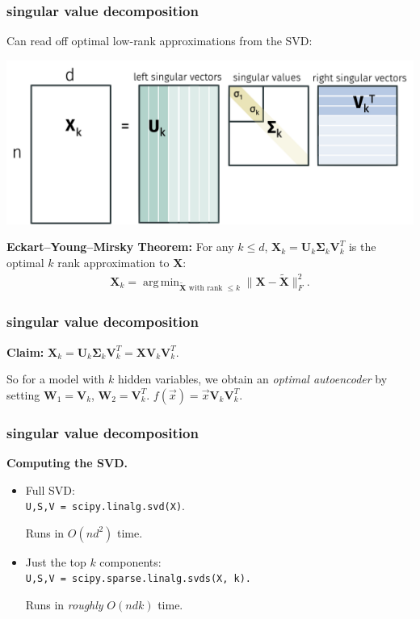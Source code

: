 \documentclass[handout,compress]{beamer}
\newcommand{\bs}[1]{\boldsymbol{#1}}
\newcommand{\bv}[1]{\mathbf{#1}}
\DeclareMathOperator*{\argmin}{arg\,min}
\begin{document}
\begin{frame}[t]
	\frametitle{singular value decomposition}
	Can read off optimal low-rank approximations from the SVD:
	\begin{center}
		\includegraphics[width=.9\textwidth]{svdk.png}
	\end{center} 
	\textbf{Eckart–Young–Mirsky Theorem:} For any $k \leq d$, $\bv{X}_k = \bv{U}_k\bs{\Sigma}_k\bv{V}_k^T$ is the optimal $k$ rank approximation to $\bv{X}$:
	\begin{align*}
	\bv{X}_k = 	\argmin_{\tilde{\bv{X}} \text{ with rank $\leq k$} } \|\bv{X} - \tilde{\bv{X}}\|_F^2.
	\end{align*}
\end{frame}

\begin{frame}[t]
	\frametitle{singular value decomposition}
	\textbf{Claim:} $\bv{X}_k = \bv{U}_k\bs{\Sigma}_k\bv{V}_k^T = \bv{X}\bv{V}_k\bv{V}_k^T$.
	\vspace{15em}
	
	So for a model with $k$ hidden variables, we obtain an \emph{optimal autoencoder} by setting $\bv{W}_1 =\bv{V}_k$, $\bv{W}_2 = \bv{V}_k^T$. $f(\vec{x}) = \vec{x}\bv{V}_k\bv{V}_k^T$.
\end{frame}

\begin{frame}[t]
	\frametitle{singular value decomposition}
	\begin{center}
		\textbf{Computing the SVD.}
	\end{center} 
	\begin{itemize}
		\item Full SVD:\\
		\texttt{U,S,V = scipy.linalg.svd(X)}. 
		\begin{center}
		\alert{Runs in $O(nd^2)$ time.}
		\end{center}
		\item Just the top $k$ components: \\
		
		\texttt{U,S,V = scipy.sparse.linalg.svds(X, k).} 
		\begin{center}
			\alert{Runs in \emph{roughly} $O(ndk)$ time.}
		\end{center}
		
	\end{itemize}	
\end{frame}
\end{document}
